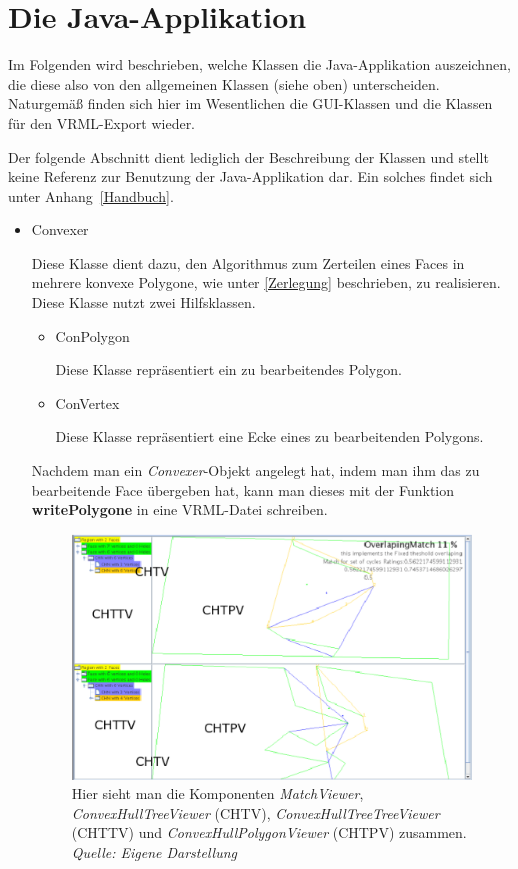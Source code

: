 \section{Die Java-Applikation}\label{java}
Im Folgenden  wird beschrieben, welche Klassen die Java-Applikation auszeichnen, die diese also von den allgemeinen Klassen (siehe oben) unterscheiden. Naturgemäß finden sich hier im Wesentlichen die GUI-Klassen und die Klassen für den VRML-Export wieder.

Der folgende Abschnitt dient lediglich der Beschreibung der Klassen und stellt keine Referenz zur Benutzung der Java-Applikation dar. Ein solches findet sich unter Anhang~\vref{Handbuch}.

\begin{itemize}
\item Convexer

Diese Klasse dient dazu, den Algorithmus zum Zerteilen eines Faces in mehrere konvexe Polygone, wie unter \vref{Zerlegung} beschrieben, zu realisieren. Diese Klasse nutzt zwei Hilfsklassen.
\begin{itemize}

\item ConPolygon

Diese Klasse repräsentiert ein zu bearbeitendes Polygon.
\item ConVertex

Diese Klasse repräsentiert eine Ecke eines zu bearbeitenden Polygons.
\end{itemize}

Nachdem man ein \textit{Convexer}-Objekt angelegt hat, indem man ihm das zu bearbeitende Face übergeben hat, kann man dieses mit der Funktion \textbf{writePolygone} in eine VRML-Datei schreiben.

\begin{figure}
	\centering
	\includegraphics[scale=0.8]{MatchViewer.eps}
	\caption[MatchViewer mit allen Unteklassen] {Hier sieht man die Komponenten \textit{MatchViewer}, \textit{ConvexHullTreeViewer} (CHTV), \textit{ConvexHullTreeTreeViewer} (CHTTV) und \textit{ConvexHullPolygonViewer} (CHTPV) zusammen.\\\textit{Quelle: Eigene Darstellung}}
	\label{fig:MatchViewer}
\end{figure}


\end{itemize}
